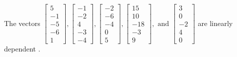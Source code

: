 \begin{exercise}
\begin{exerciseStatement}
  \end{exerciseStatement}
  \begin{exerciseAnswer}
   The vectors \(\left[\begin{array}{r}
5 \\
-1 \\
-5 \\
-6 \\
1
\end{array}\right] , \left[\begin{array}{r}
-1 \\
-2 \\
4 \\
-3 \\
-4
\end{array}\right] , \left[\begin{array}{r}
-2 \\
-6 \\
-4 \\
0 \\
5
\end{array}\right] , \left[\begin{array}{r}
15 \\
10 \\
-18 \\
-3 \\
9
\end{array}\right] , \text{ and } \left[\begin{array}{r}
3 \\
0 \\
-2 \\
4 \\
0
\end{array}\right]\) are 
  	 linearly dependent  .
  


  \end{exerciseAnswer}
\end{exercise}